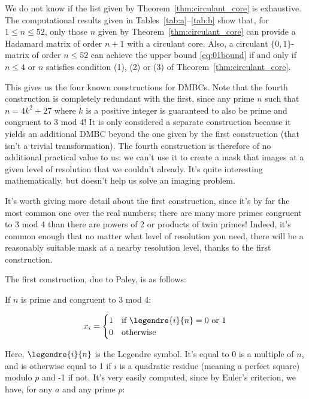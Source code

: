 We do not know if the list given by Theorem~\ref{thm:circulant_core} is
exhaustive.  The computational results given in
Tables~\ref{tab:a}--\ref{tab:b} show that, for $1 \le n \le 52$,
only those $n$
given by Theorem~\ref{thm:circulant_core} can provide a Hadamard matrix of
order $n+1$ with a circulant core.
Also, a circulant $\{0,1\}$-matrix of order $n \le 52$ can achieve the upper
bound \eqref{eq:01bound} if and only if $n \le 4$ or $n$ satisfies condition
(1), (2) or (3) of Theorem~\ref{thm:circulant_core}.
 
This gives us the four known constructions for DMBCs. Note that the fourth construction is completely redundant with the first, since any prime $n$ such that $n = 4k^2 + 27$ where $k$ is a positive integer is guaranteed to also be prime and congruent to 3 mod 4! It is only considered a separate construction because it yields an additional DMBC beyond the one given by the first construction (that isn't a trivial transformation). The fourth construction is therefore of no additional practical value to us: we can't use it to create a mask that images at a given level of resolution that we couldn't already. It's quite interesting mathematically, but doesn't help us solve an imaging problem.

It's worth giving more detail about the first construction, since it's by far the most common one over the real numbers; there are many more primes congruent to 3 mod 4 than there are powers of 2 or products of twin primes! Indeed, it's common enough that no matter what level of resolution you need, there will be a reasonably suitable mask at a nearby resolution level, thanks to the first construction.

The first construction, due to Paley, is as follows:

If $n$ is prime and congruent to 3 mod 4:

\[
  x_i =
  \begin{cases}
                                   1 & \text{if } \legendre{i}{n} = 0 \text{ or } 1 \\
                                   0 & \text{otherwise} \\
  \end{cases}
\]

Here, $\legendre{i}{n}$ is the Legendre symbol. It's equal to 0 is a multiple of $n$, and is otherwise equal to 1 if $i$ is a quadratic residue (meaning a perfect square) modulo $p$ and -1 if not. It's very easily computed, since by Euler's criterion, we have, for any $a$ and any prime $p$:

